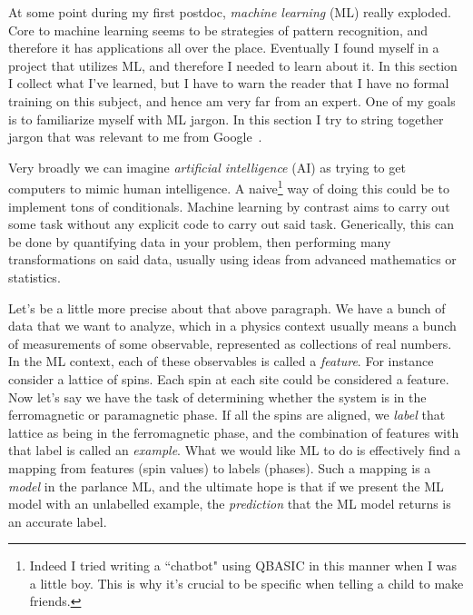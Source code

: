At some point during my first postdoc, {\it machine learning} (ML) really exploded.
Core to machine learning seems to be strategies of pattern recognition, and
therefore it has applications all over the place. Eventually I found myself in a
project that utilizes ML, and therefore I needed to learn about it. In this
section I collect what I've learned, but I have to warn the reader that
I have no formal training on this subject, and hence am very far from an expert.
One of my goals is to familiarize myself with ML jargon. In this section I
try to string together jargon that was relevant to me from
Google~\cite{google_ML}.

Very broadly we can imagine {\it artificial intelligence} (AI) as trying to get computers to mimic human intelligence. 
A naive\footnote{Indeed I tried writing a ``chatbot" using QBASIC in this
manner when I was a little boy. This is why it's crucial to be specific
when telling a child to make friends.} way of doing this could be to implement tons 
of conditionals. Machine learning by contrast aims to carry out some
task without any explicit code to carry out said task. Generically,
this can be done by quantifying data in your problem, then performing many
transformations on said data, usually using ideas from advanced mathematics
or statistics.

Let's be a little more precise about that above paragraph.
We have a bunch of data that we want to analyze, which in a physics context
usually means a bunch of measurements of some observable,
represented as collections of real numbers. In the ML context, each of
these observables is called a {\it feature}. For instance
consider a lattice of spins. Each spin at each site could be considered
a feature. Now let's say we have the task of determining
whether the system is in the ferromagnetic or paramagnetic phase.
If all the spins are aligned, we {\it label} that lattice
as being in the ferromagnetic phase, and the combination of features
with that label is called an {\it example}.
What we would like ML to do
is effectively find a mapping from features (spin values) to labels (phases). 
Such a mapping is a {\it model} in the parlance ML, and
the ultimate hope is that if we present the ML model with an unlabelled
example, the {\it prediction} 
that the ML model returns is an accurate label.

